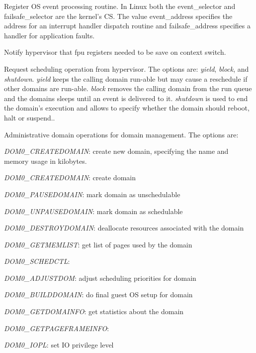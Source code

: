 \documentclass[11pt,twoside,final,openright]{xenstyle}
\begin{document}

Register OS event processing routine.  In
Linux both the event\_selector and failsafe\_selector are the
kernel's CS.  The value event\_address specifies the address for an
interrupt handler dispatch routine and failsafe\_address specifies a
handler for application faults.



Notify hypervisor that fpu registers needed to be save on context switch.



Request scheduling operation from hypervisor. The options are: {\it
yield}, {\it block}, and {\it shutdown}.  {\it yield} keeps the
calling domain run-able but may cause a reschedule if other domains
are run-able.  {\it block} removes the calling domain from the run
queue and the domains sleeps until an event is delivered to it.  {\it
shutdown} is used to end the domain's execution and allows to specify
whether the domain should reboot, halt or suspend..



Administrative domain operations for domain management. The options are:

{\it DOM0\_CREATEDOMAIN}: create new domain, specifying the name and memory usage
in kilobytes.

{\it DOM0\_CREATEDOMAIN}: create domain

{\it DOM0\_PAUSEDOMAIN}: mark domain as unschedulable

{\it DOM0\_UNPAUSEDOMAIN}: mark domain as schedulable

{\it DOM0\_DESTROYDOMAIN}: deallocate resources associated with the domain

{\it DOM0\_GETMEMLIST}: get list of pages used by the domain

{\it DOM0\_SCHEDCTL}:

{\it DOM0\_ADJUSTDOM}: adjust scheduling priorities for domain

{\it DOM0\_BUILDDOMAIN}: do final guest OS setup for domain

{\it DOM0\_GETDOMAINFO}: get statistics about the domain

{\it DOM0\_GETPAGEFRAMEINFO}:

{\it DOM0\_IOPL}: set IO privilege level
\end{document}

